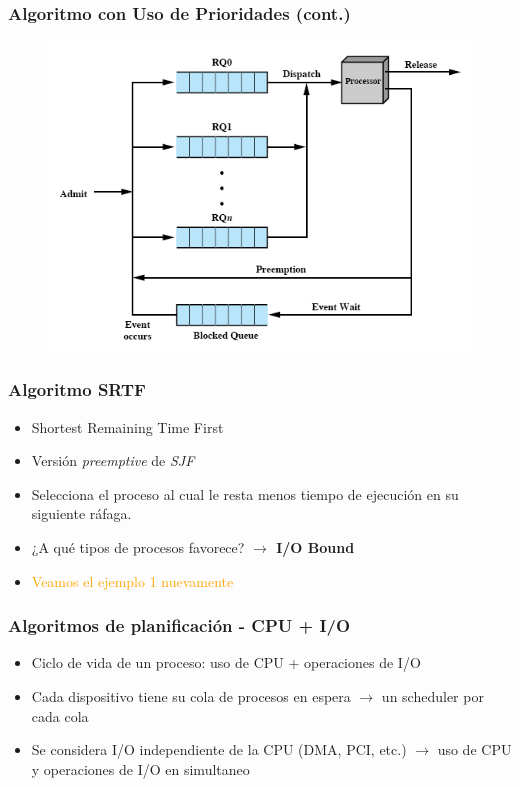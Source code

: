 \begin{frame}
  \frametitle{Algoritmo con Uso de Prioridades (cont.)}
	\begin{figure}
	    \includegraphics[scale=0.4]{images/priorities.png}
	\end{figure}
\end{frame}

\begin{frame}
  \frametitle{Algoritmo \textbf{SRTF}}
  \begin{itemize}
  		\item Shortest Remaining Time First  		
		\item Versión \emph{preemptive} de \textit{SJF}
		\item Selecciona el proceso al cual le resta menos tiempo de ejecución en su siguiente ráfaga.
		\item ¿A qué tipos de procesos favorece?
		\pause
		\textbf{$\rightarrow$ I/O Bound}
		\pause
		\item \textcolor{orange}{Veamos el ejemplo 1 nuevamente}
  \end{itemize}
\end{frame}

\begin{frame}
  \frametitle{Algoritmos de planificación - CPU + I/O}
  \begin{itemize}
  		\item Ciclo de vida de un proceso: uso de CPU + operaciones de I/O
		\item Cada dispositivo tiene su cola de procesos en espera $\rightarrow$ un scheduler por cada cola
		\item Se considera I/O independiente de la CPU (DMA, PCI, etc.) $\rightarrow$ uso de CPU y operaciones de I/O en simultaneo
  \end{itemize}
\end{frame}

